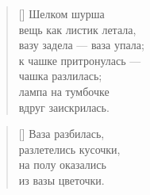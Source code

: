 \documentclass[a5paper,11pt]{memoir}
\begin{document}
\begin{verse}[\versewidth]
\hspace{-1cm}Шелком шурша\\
\hspace{-1cm}вещь как листик летала,\\
\hspace{-1cm}вазу задела --- ваза упала;\\
\hspace{-1cm}к чашке притронулась ---\\
\hspace{-1cm}чашка разлилась;\\
\hspace{-1cm}лампа на тумбочке\\
\hspace{-1cm}вдруг заискрилась.
\end{verse}

\begin{verse}[\versewidth]
\hspace{-2cm}Ваза разбилась,\\
\hspace{-2cm}разлетелись кусочки, \\
\hspace{-2cm}на полу оказались \\
\hspace{-2cm}из вазы цветочки. \\
\end{verse}
\end{document}
